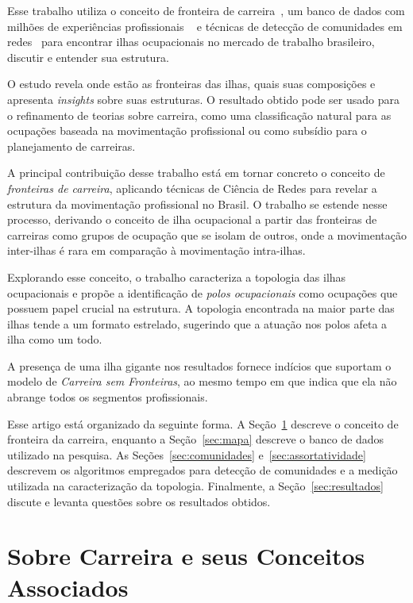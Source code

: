 \documentclass[
  article,
  11pt,
  a4paper,
  english,
  brazil,
  sumario=tradicional]{abntex2}
\begin{document}
Esse trabalho utiliza o conceito de fronteira de carreira~\cite{Gunz2007-hr}, um banco de dados com milhões de experiências profissionais ~\cite{VAGAS_Tecnologia2014-yv} e técnicas de detecção de comunidades em redes~\cite{Rosvall2009-sd,Edler2017-kt} para encontrar ilhas ocupacionais no mercado de trabalho brasileiro, discutir e entender sua estrutura.

O estudo revela onde estão as fronteiras das ilhas, quais suas composições e apresenta \textit{insights} sobre suas estruturas. O resultado obtido pode ser usado para o refinamento de teorias sobre carreira, como uma classificação natural para as ocupações baseada na movimentação profissional ou como subsídio para o planejamento de carreiras.

A principal contribuição desse trabalho está em tornar concreto o conceito de \textit{fronteiras de carreira}, aplicando técnicas de Ciência de Redes para revelar a estrutura da movimentação profissional no Brasil. O trabalho se estende nesse processo, derivando o conceito de ilha ocupacional a partir das fronteiras de carreiras como grupos de ocupação que se isolam de outros, onde a movimentação inter-ilhas é rara em comparação à movimentação intra-ilhas.

Explorando esse conceito, o trabalho caracteriza a topologia das ilhas ocupacionais e propõe a identificação de \textit{polos ocupacionais} como ocupações que possuem papel crucial na estrutura. A topologia encontrada na maior parte das ilhas tende a um formato estrelado, sugerindo que a atuação nos polos afeta a ilha como um todo.

A presença de uma ilha gigante nos resultados fornece indícios que suportam o modelo de \textit{Carreira sem Fronteiras}, ao mesmo tempo em que indica que ela não abrange todos os segmentos profissionais.

Esse artigo está organizado da seguinte forma. A Seção~\ref{sec:carreira} descreve o conceito de fronteira da carreira, enquanto a Seção~\ref{sec:mapa} descreve o banco de dados utilizado na pesquisa. As Seções~\ref{sec:comunidades} e~\ref{sec:assortatividade} descrevem os algoritmos empregados para detecção de comunidades e a medição utilizada na caracterização da topologia. Finalmente, a Seção~\ref{sec:resultados} discute e levanta questões sobre os resultados obtidos.

\section{Sobre Carreira e seus Conceitos Associados} \label{sec:carreira}
\end{document}

